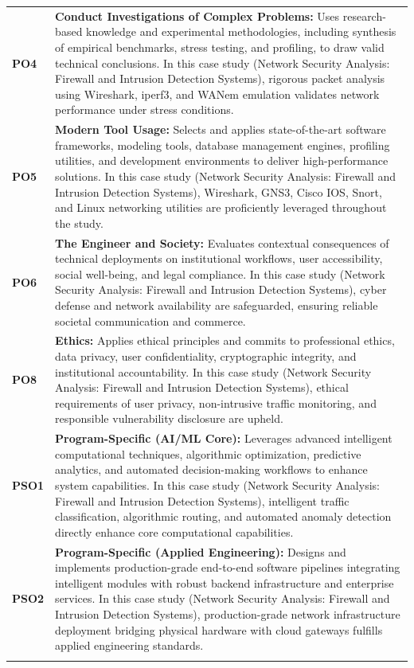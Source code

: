 {\begin{longtable}{@{}>{\centering\arraybackslash}p{1.8cm} p{13.2cm}@{}}
    \addlinespace
\textbf{PO4} & \textbf{Conduct Investigations of Complex Problems:} Uses research-based knowledge and experimental methodologies, including synthesis of empirical benchmarks, stress testing, and profiling, to draw valid technical conclusions. In this case study (Network Security Analysis: Firewall and Intrusion Detection Systems), rigorous packet analysis using Wireshark, iperf3, and WANem emulation validates network performance under stress conditions. \\
    \addlinespace
\textbf{PO5} & \textbf{Modern Tool Usage:} Selects and applies state-of-the-art software frameworks, modeling tools, database management engines, profiling utilities, and development environments to deliver high-performance solutions. In this case study (Network Security Analysis: Firewall and Intrusion Detection Systems), Wireshark, GNS3, Cisco IOS, Snort, and Linux networking utilities are proficiently leveraged throughout the study. \\
    \addlinespace
\textbf{PO6} & \textbf{The Engineer and Society:} Evaluates contextual consequences of technical deployments on institutional workflows, user accessibility, social well-being, and legal compliance. In this case study (Network Security Analysis: Firewall and Intrusion Detection Systems), cyber defense and network availability are safeguarded, ensuring reliable societal communication and commerce. \\
    \addlinespace
\textbf{PO8} & \textbf{Ethics:} Applies ethical principles and commits to professional ethics, data privacy, user confidentiality, cryptographic integrity, and institutional accountability. In this case study (Network Security Analysis: Firewall and Intrusion Detection Systems), ethical requirements of user privacy, non-intrusive traffic monitoring, and responsible vulnerability disclosure are upheld. \\
    \addlinespace
\textbf{PSO1} & \textbf{Program-Specific (AI/ML Core):} Leverages advanced intelligent computational techniques, algorithmic optimization, predictive analytics, and automated decision-making workflows to enhance system capabilities. In this case study (Network Security Analysis: Firewall and Intrusion Detection Systems), intelligent traffic classification, algorithmic routing, and automated anomaly detection directly enhance core computational capabilities. \\
    \addlinespace
\textbf{PSO2} & \textbf{Program-Specific (Applied Engineering):} Designs and implements production-grade end-to-end software pipelines integrating intelligent modules with robust backend infrastructure and enterprise services. In this case study (Network Security Analysis: Firewall and Intrusion Detection Systems), production-grade network infrastructure deployment bridging physical hardware with cloud gateways fulfills applied engineering standards. \\
    \addlinespace
    \bottomrule
\end{longtable}}